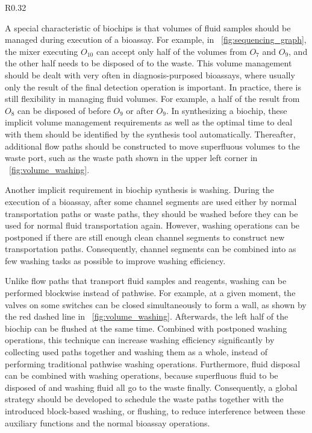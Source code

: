 \label{sec:volume_washing}

\begin{wrapfigure}[15]{R}{0.32\textwidth}
{
\vskip -13pt
\figurefontsize
\centering

\caption{Volume management and washing.}
\label{fig:volume_washing}
}
\end{wrapfigure}

A special characteristic of biochips is that volumes of fluid samples
should be managed during execution of a bioassay. For example, in
\figname~\ref{fig:sequencing_graph}, the mixer executing $O_{10}$ can
accept only half of the volumes from $O_7$ and $O_9$, and the other half needs to
be disposed of to the waste.
This volume management should be dealt with very often in
diagnosis-purposed bioassays, where usually only the result of the
final detection operation is important. 
In practice, 
there is still flexibility in managing fluid volumes. For example, 
a half of the result from $O_8$ can be disposed of before $O_9$ or after $O_9$.
In synthesizing a biochip, these implicit volume management requirements 
as well as the optimal time to deal with them
should be identified by the synthesis tool automatically.
Thereafter, additional flow paths should be constructed to move 
superfluous volumes to the waste port, such as the waste path shown in the
upper left corner in
\figname~\ref{fig:volume_washing}.

Another implicit requirement in biochip synthesis is washing.
During the execution of a bioassay, after some channel segments are 
used either by normal transportation paths or
waste paths, they should be washed before they can be used for normal fluid
transportation again. 
However, washing operations can be postponed if there are still enough 
clean channel segments to construct new transportation paths. 
Consequently,
channel segments can be combined into as few washing tasks as possible 
to improve washing efficiency.

Unlike flow paths that transport fluid samples and reagents,
washing can be performed blockwise instead of pathwise. For example, at
a given moment, the valves on some switches can be closed 
simultaneously to form a wall, as shown by the red dashed line in \figname~\ref{fig:volume_washing}.
Afterwards, the left half of the biochip can be flushed at the same time. 
Combined 
with postponed washing operations,
this technique can increase washing efficiency significantly by 
collecting used paths together and washing them as a whole, instead of performing
traditional pathwise washing operations. 
Furthermore, fluid disposal can be combined with 
washing
operations, 
because superfluous fluid to be disposed of and washing fluid all go 
to the waste finally. Consequently, a global 
strategy should be developed to schedule the waste 
paths together
with the introduced block-based washing, or flushing, 
to reduce
interference between these auxiliary functions and the normal 
bioassay operations.


